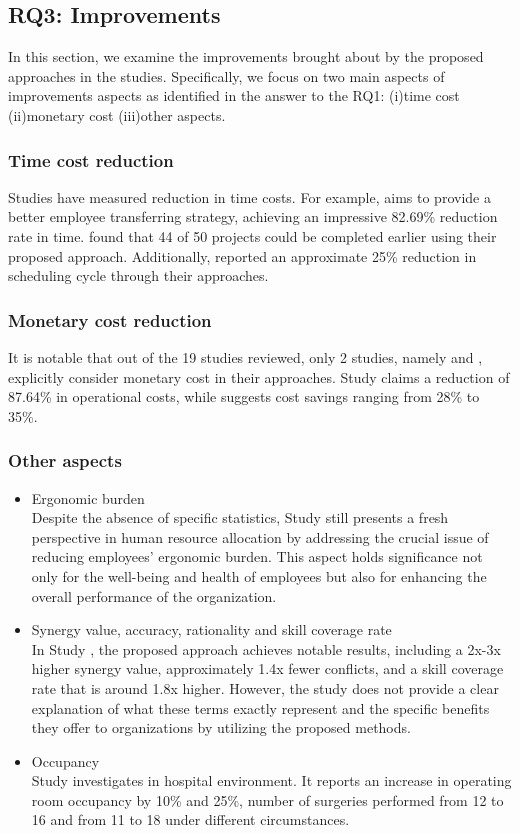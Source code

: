 \documentclass[runningheads]{llncs}
\begin{document}
\subsection{RQ3: Improvements}
In this section, we examine the improvements brought about by the proposed approaches in the studies. Specifically, we focus on two main aspects of improvements aspects as identified in the answer to the RQ1: (i)time cost (ii)monetary cost (iii)other aspects.
\subsubsection{Time cost reduction}
Studies \cite{study5,study7,study18} have measured reduction in time costs. For example, \cite{study18} aims to provide a better employee transferring strategy, achieving an impressive 82.69\% reduction rate in time. \cite{study7} found that 44 of 50 projects could be completed earlier using their proposed approach. Additionally, \cite{study5} reported an approximate 25\% reduction in scheduling cycle through their approaches.
\subsubsection{Monetary cost reduction}
It is notable that out of the 19 studies reviewed, only 2 studies, namely \cite{study18}  and \cite{study5}, explicitly consider monetary cost in their approaches. Study \cite{study18} claims a reduction of 87.64\% in operational costs, while \cite{study5} suggests cost savings ranging from 28\% to 35\%.
\subsubsection{Other aspects}
\begin{itemize}
    \item Ergonomic burden\\
    Despite the absence of specific statistics, Study \cite{study16} still presents a fresh perspective in human resource allocation by addressing the crucial issue of reducing employees' ergonomic burden. This aspect holds significance not only for the well-being and health of employees but also for enhancing the overall performance of the organization.
    \item Synergy value, accuracy, rationality and skill coverage rate\\
    In Study \cite{study19}, the proposed approach achieves notable results, including a 2x-3x higher synergy value, approximately 1.4x fewer conflicts, and a skill coverage rate that is around 1.8x higher. However, the study does not provide a clear explanation of what these terms exactly represent and the specific benefits they offer to organizations by utilizing the proposed methods.
    \item Occupancy\\
    Study \cite{study8} investigates in hospital environment. It reports an increase in  operating room occupancy by 10\% and 25\%, number of surgeries performed from 12 to 16 and from 11 to 18 under different circumstances.
\end{itemize}
\end{document}
